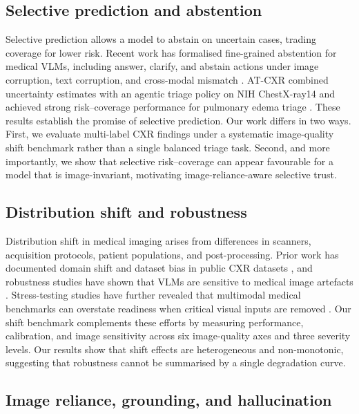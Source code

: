 \subsection{Selective prediction and abstention}

Selective prediction allows a model to abstain on uncertain cases, trading coverage for lower risk. Recent work has formalised fine-grained abstention for medical VLMs, including answer, clarify, and abstain actions under image corruption, text corruption, and cross-modal mismatch \citep{nguyen2026answer}. AT-CXR combined uncertainty estimates with an agentic triage policy on NIH ChestX-ray14 and achieved strong risk--coverage performance for pulmonary edema triage \citep{li2025atcxr}. These results establish the promise of selective prediction. Our work differs in two ways. First, we evaluate multi-label CXR findings under a systematic image-quality shift benchmark rather than a single balanced triage task. Second, and more importantly, we show that selective risk--coverage can appear favourable for a model that is image-invariant, motivating image-reliance-aware selective trust.

\subsection{Distribution shift and robustness}

Distribution shift in medical imaging arises from differences in scanners, acquisition protocols, patient populations, and post-processing. Prior work has documented domain shift and dataset bias in public CXR datasets \citep{rafferty2026limitations}, and robustness studies have shown that VLMs are sensitive to medical image artefacts \citep{cheng2025robustness}. Stress-testing studies have further revealed that multimodal medical benchmarks can overstate readiness when critical visual inputs are removed \citep{gu2025illusion}. Our shift benchmark complements these efforts by measuring performance, calibration, and image sensitivity across six image-quality axes and three severity levels. Our results show that shift effects are heterogeneous and non-monotonic, suggesting that robustness cannot be summarised by a single degradation curve.

\subsection{Image reliance, grounding, and hallucination}

